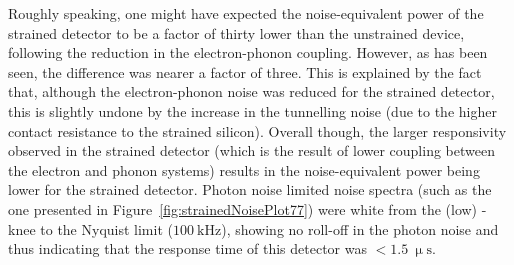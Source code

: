\par 
Roughly speaking, one might have expected the noise-equivalent power of the strained detector to be a factor of thirty lower than the unstrained device, following the reduction in the electron-phonon coupling. However, as has been seen, the difference was nearer a factor of three. This is explained by the fact that, although the electron-phonon noise was reduced for the strained detector, this is slightly undone by the increase in the tunnelling noise (due to the higher contact resistance to the strained silicon). Overall though, the larger responsivity observed in the strained detector (which is the result of lower coupling between the electron and phonon systems) results in the noise-equivalent power being lower for the strained detector. Photon noise limited noise spectra (such as the one presented in Figure~\ref{fig:strainedNoisePlot77}) were white from the (low) -knee to the Nyquist limit ($100~\mathrm{kHz}$), showing no roll-off in the photon noise and thus indicating that the response time of this detector was $< 1.5~\mathrm{\upmu s}$.
%
